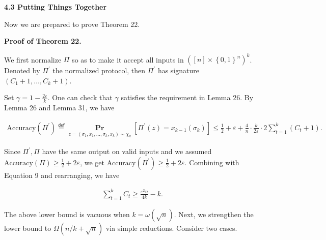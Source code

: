 \documentclass[10pt,a4paper]{article}
\begin{document}
\par\medskip\noindent\textbf{
4.3 Putting Things Together}\par




Now we are prepared to prove Theorem 22.\par




\par\medskip\noindent\textbf{Proof of Theorem 22.}\par




We first normalize $\Pi$ so as to make it accept all inputs in $([n]\times\left\{0,1\right\}^{n})^{k}$.
Denoted by $\Pi^{\prime}$ the normalized protocol, then $\Pi^{\prime}$ has signature $(C_{1}+1,\dots,C_{k}+1)$.\par




Set $\gamma=1-\frac{2\varepsilon}{k}$.
One can check that $\gamma$ satisfies the requirement in Lemma 26.
By Lemma 26 and Lemma 31,
we have\par


\[\begin{gathered}
\text{Accuracy}(\Pi^{\prime})\stackrel{{\scriptstyle\mathsf{def}}}{{=}}\operatorname*{\mathbf{Pr}}_{z=(\sigma_{1},x_{1},\dots,\sigma_{k},x_{k})\sim\chi_{k}}\left[\Pi^{\prime}(z)=x_{k-1}(\sigma_{k})\right]\leq\frac{1}{2}+\varepsilon+\frac{4}{n}\cdot\frac{k}{2\varepsilon}\cdot 2\sum_{t=1}^{k}(C_{t}+1).
\end{gathered}\]


Since $\Pi^{\prime},\Pi$ have the same output on valid inputs and we assumed $\text{Accuracy}(\Pi)\geq\frac{1}{2}+2\varepsilon$,
we get $\text{Accuracy}(\Pi^{\prime})\geq\frac{1}{2}+2\varepsilon$.
Combining with Equation 9 and rearranging,
we have\par


\[\begin{gathered}
\sum_{t=1}^{k}C_{t}\geq\frac{\varepsilon^{2}n}{4k}-k.
\end{gathered}\]




The above lower bound is vacuous when $k=\omega(\sqrt{n})$.
Next, we strengthen the lower bound to $\Omega(n/k+\sqrt{n})$ via simple reductions. Consider two cases.\par
\end{document}
